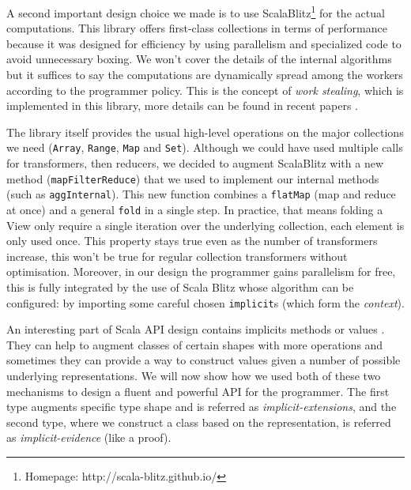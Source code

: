 \documentclass[a4paper,12pt,twocolumn]{article}
\begin{document}
A second important design choice we made is to use ScalaBlitz\footnote{Homepage: http://scala-blitz.github.io/} for the actual computations.
This library offers first-class collections in terms of performance because it was designed for efficiency by using parallelism and specialized code to avoid unnecessary boxing.
We won't cover the details of the internal algorithms but it suffices to say the computations are dynamically spread among the workers according to the programmer policy.
This is the concept of {\it work stealing}, which is implemented in this library, more details can be found in recent papers \cite{scala-parallel}.

The library itself provides the usual high-level operations on the major collections we need (\verb|Array|, \verb|Range|, \verb|Map| and \verb|Set|).
Although we could have used multiple calls for transformers, then reducers, we decided to augment ScalaBlitz with a new method (\verb|mapFilterReduce|) that we used to implement our internal methods (such as \verb|aggInternal|).
This new function combines a \verb|flatMap| (map and reduce at once) and a general \verb|fold| in a single step.
In practice, that means folding a View only require a single iteration over the underlying collection, each element is only used once.
This property stays true even as the number of transformers increase, this won't be true for regular collection transformers without optimisation.
Moreover, in our design the programmer gains parallelism for free, this is fully integrated by the use of Scala Blitz whose algorithm can be configured: by importing some careful chosen \verb|implicit|s (which form the {\it context}\/).

An interesting part of Scala API design contains implicits methods or values \cite{scala-implicits}.
They can help to augment classes of certain shapes with more operations and sometimes they can provide a way to construct values given a number of possible underlying representations.
We will now show how we used both of these two mechanisms to design a fluent and powerful API for the programmer.
The first type augments specific type shape and is referred as {\it implicit-extensions}, and the second type, where we construct a class based on the representation, is referred as {\it implicit-evidence} (like a proof).
\end{document}
